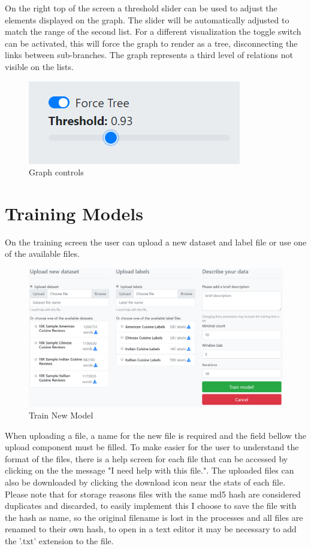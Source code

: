 \documentclass[table,xcdraw]{article}
\begin{document}
On the right top of the screen a threshold slider can be used to adjust the elements displayed on the graph. The slider will be automatically adjusted to match the range of the second list. For a different visualization the toggle switch can be activated, this will force the graph to render as a tree, disconnecting the links between sub-branches. The graph represents a third level of relations not visible on the lists.

\begin{figure}[H]
	\centering
	\includegraphics{screen_threshold}
	\caption{Graph controls}
	\label{fig:screen_threshold}
	\end{figure}


\section{Training Models}

On the training screen the user can upload a new dataset and label file or use one of the available files.

\begin{figure}[H]
	\centering
	\includegraphics[width=\linewidth]{screen_train_new_model}
	\caption{Train New Model}
	\label{fig:screen_train_new_model}
	\end{figure}

When uploading a file, a name for the new file is required and the field bellow the upload component must be filled.
To make easier for the user to understand the format of the files, there is a help screen for each file that can be accessed by clicking on the the message "I need help with this file.". The uploaded files can also be downloaded by clicking the download icon near the stats of each file. Please note that for storage reasons files with the same md5 hash are considered duplicates and discarded, to easily implement this I choose to save the file with the hash as name, so the original filename is lost in the processes and all files are renamed to their own hash, to open in a text editor it may be necessary to add the '.txt' extension to the file.
\end{document}
